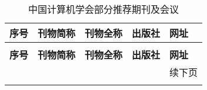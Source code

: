 \documentclass[print, promaster, vlined]{DissertUESTC}
\begin{document}
	\begin{longtable}{p{2em} p{4.5em} p{11em} p{6em} p{11em}}
		\caption{中国计算机学会部分推荐期刊及会议} \label{tab: 中国计算机学会部分推荐期刊及会议} \\
		
		\toprule
		\textbf{序号} & \textbf{刊物简称} & \textbf{刊物全称} & \textbf{出版社} & \textbf{网址} \\
		\midrule
		\endfirsthead
		
		\multicolumn{5}{c}{\CPcaption{中国计算机学会部分推荐期刊及会议}}\\
		\toprule
		\textbf{序号} & \textbf{刊物简称} & \textbf{刊物全称} & \textbf{出版社} & \textbf{网址} \\
		\midrule
		\endhead
		
		\bottomrule
		& & & & \hfill 续下页 \\  %
		\endfoot
		
		\bottomrule
		\endlastfoot
		

\end{longtable}
\end{document}
